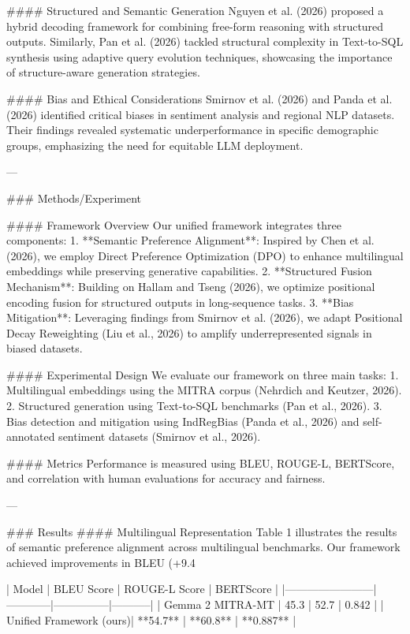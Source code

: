 #### Structured and Semantic Generation
Nguyen et al. (2026) proposed a hybrid decoding framework for combining free-form reasoning with structured outputs. Similarly, Pan et al. (2026) tackled structural complexity in Text-to-SQL synthesis using adaptive query evolution techniques, showcasing the importance of structure-aware generation strategies.

#### Bias and Ethical Considerations
Smirnov et al. (2026) and Panda et al. (2026) identified critical biases in sentiment analysis and regional NLP datasets. Their findings revealed systematic underperformance in specific demographic groups, emphasizing the need for equitable LLM deployment.

---

### Methods/Experiment

#### Framework Overview
Our unified framework integrates three components:
1. **Semantic Preference Alignment**: Inspired by Chen et al. (2026), we employ Direct Preference Optimization (DPO) to enhance multilingual embeddings while preserving generative capabilities.
2. **Structured Fusion Mechanism**: Building on Hallam and Tseng (2026), we optimize positional encoding fusion for structured outputs in long-sequence tasks.
3. **Bias Mitigation**: Leveraging findings from Smirnov et al. (2026), we adapt Positional Decay Reweighting (Liu et al., 2026) to amplify underrepresented signals in biased datasets.

#### Experimental Design
We evaluate our framework on three main tasks:
1. Multilingual embeddings using the MITRA corpus (Nehrdich and Keutzer, 2026).
2. Structured generation using Text-to-SQL benchmarks (Pan et al., 2026).
3. Bias detection and mitigation using IndRegBias (Panda et al., 2026) and self-annotated sentiment datasets (Smirnov et al., 2026).

#### Metrics
Performance is measured using BLEU, ROUGE-L, BERTScore, and correlation with human evaluations for accuracy and fairness.

---

### Results
#### Multilingual Representation
Table 1 illustrates the results of semantic preference alignment across multilingual benchmarks. Our framework achieved improvements in BLEU (+9.4%

| Model                  | BLEU Score | ROUGE-L Score | BERTScore |
|------------------------|------------|---------------|-----------|
| Gemma 2 MITRA-MT       | 45.3       | 52.7          | 0.842     |
| Unified Framework (ours)| **54.7**   | **60.8**      | **0.887** |

